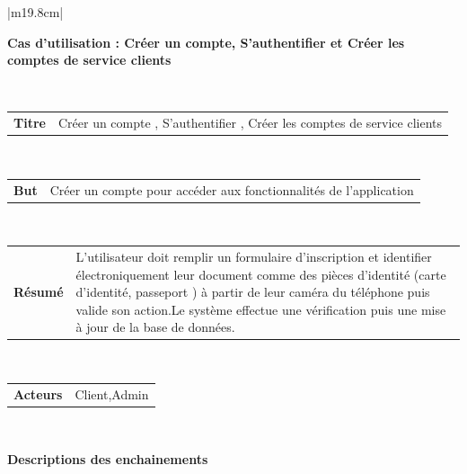 \begin{table}[h]
	\hspace*{-2cm}
	\begin{tabular}{|m{19.8cm}|}
		\hline
		\begin{center}
		 \textbf{Cas d’utilisation : Créer un compte, S’authentifier et Créer les comptes de service clients }
		\end{center}
		\\
		[-4ex] 
		\hline
			\begin{tabular}{m{3cm}|m{14cm}}
			
				\centering 	\textbf{Titre} & Créer un compte , S’authentifier , Créer les comptes de service clients
				\\
				[0ex] 
			\end{tabular}
		\\
		
		\hline
			\begin{tabular}{m{3cm}|m{14cm}}
			
			\centering 	\textbf{But} & Créer un compte pour accéder aux fonctionnalités de l’application 	\\
			[0ex] 
			
		\end{tabular}
		\\
		\hline
			\begin{tabular}{m{3cm}|m{15.5cm}}
			
			\centering 	\textbf{Résumé} & L'utilisateur doit remplir un formulaire d’inscription et identifier électroniquement leur document comme des pièces d’identité (carte d’identité, passeport ) à partir de leur caméra du téléphone puis valide son action.\newline Le système effectue une vérification puis une mise à jour de la base de données.
			\\
			[0ex] 
		\end{tabular}
		\\
		
		\hline
			\begin{tabular}{m{3cm}|m{14cm}}
			
			\centering 	\textbf{Acteurs } & Client,Admin \\[0ex]
			
		\end{tabular}
		\\
		 
		\hline
		\begin{center}
			\textbf{Descriptions des enchainements}
		\end{center}
		\\
		[-4ex] 
		\hline	
			\begin{tabular}{m{9.3cm}|m{9.3cm}}
			

\end{tabular}
\end{tabular}
\end{table}
